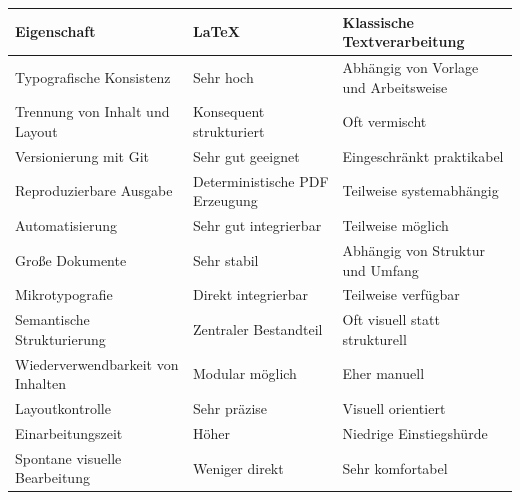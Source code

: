 \documentclass[11pt,a4paper]{article}
\newcommand{\good}[1]{\textcolor{neutralgood}{#1}}
\newcommand{\neutralwarn}[1]{\textcolor{neutralmid}{#1}}
\begin{document}
\begin{longtable}{>{\raggedright\arraybackslash}p{5.5cm} >{\raggedright\arraybackslash}p{4.3cm} >{\raggedright\arraybackslash}p{4.3cm}}

\toprule
\textbf{Eigenschaft} & \textbf{LaTeX} & \textbf{Klassische Textverarbeitung} \\
\midrule
\endhead

Typografische Konsistenz & \good{Sehr hoch} & \neutralwarn{Abhängig von Vorlage und Arbeitsweise} \\

Trennung von Inhalt und Layout & \good{Konsequent strukturiert} & \neutralwarn{Oft vermischt} \\

Versionierung mit Git & \good{Sehr gut geeignet} & \neutralwarn{Eingeschränkt praktikabel} \\

Reproduzierbare Ausgabe & \good{Deterministische PDF Erzeugung} & \neutralwarn{Teilweise systemabhängig} \\

Automatisierung & \good{Sehr gut integrierbar} & \neutralwarn{Teilweise möglich} \\

Große Dokumente & \good{Sehr stabil} & \neutralwarn{Abhängig von Struktur und Umfang} \\

Mikrotypografie & \good{Direkt integrierbar} & \neutralwarn{Teilweise verfügbar} \\

Semantische Strukturierung & \good{Zentraler Bestandteil} & \neutralwarn{Oft visuell statt strukturell} \\

Wiederverwendbarkeit von Inhalten & \good{Modular möglich} & \neutralwarn{Eher manuell} \\

Layoutkontrolle & \good{Sehr präzise} & \neutralwarn{Visuell orientiert} \\

Einarbeitungszeit & \neutralwarn{Höher} & \good{Niedrige Einstiegshürde} \\

Spontane visuelle Bearbeitung & \neutralwarn{Weniger direkt} & \good{Sehr komfortabel} \\

\bottomrule

\end{longtable}
\end{document}

